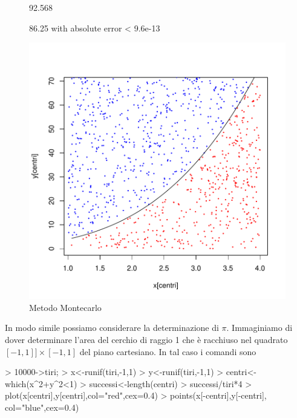 \documentclass[onecolumn,11pt]{book}
\begin{document}
\begin{figure}[htbp]
\begin{center}
\begin{Schunk}
\begin{Soutput}
[1] 92.568
\end{Soutput}
\begin{Soutput}
86.25 with absolute error < 9.6e-13
\end{Soutput}
\end{Schunk}
\includegraphics{Rmatematica-159}
\caption{Metodo Montecarlo }
\label{fig:Montec1}
\end{center}
\end{figure}

In modo simile possiamo considerare la determinazione di $\pi$. Immaginiamo di dover determinare l'area del cerchio di raggio 1 che \`e racchiuso nel quadrato $[-1,1]]\times[-1,1]$ del piano cartesiano.
In tal caso i comandi sono
\begin{Schunk}
\begin{Sinput}
> 10000->tiri;
> x<-runif(tiri,-1,1)		 
> y<-runif(tiri,-1,1)
> centri<-which(x^2+y^2<1)	 
> successi<-length(centri)
> successi/tiri*4                    
> plot(x[centri],y[centri],col="red",cex=0.4)   
> points(x[-centri],y[-centri], col="blue",cex=0.4)  
\end{Sinput}
\end{Schunk}
\end{document}
